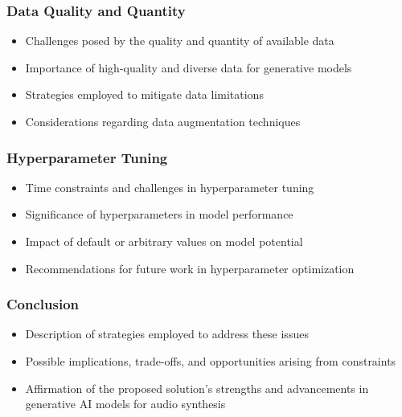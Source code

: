 \begin{frame}
    \frametitle{Data Quality and Quantity}

    \begin{itemize}
        \item Challenges posed by the quality and quantity of available data
        \item Importance of high-quality and diverse data for generative models
        \item Strategies employed to mitigate data limitations
        \item Considerations regarding data augmentation techniques
    \end{itemize}
    
\end{frame}

\begin{frame}
    \frametitle{Hyperparameter Tuning}

    \begin{itemize}
        \item Time constraints and challenges in hyperparameter tuning
        \item Significance of hyperparameters in model performance
        \item Impact of default or arbitrary values on model potential
        \item Recommendations for future work in hyperparameter optimization
    \end{itemize}
    
\end{frame}

\begin{frame}
    \frametitle{Conclusion}

    \begin{itemize}
        \item Description of strategies employed to address these issues
        \item Possible implications, trade-offs, and opportunities arising from constraints
        \item Affirmation of the proposed solution's strengths and advancements in generative AI models for audio synthesis
    \end{itemize}
    
\end{frame}
